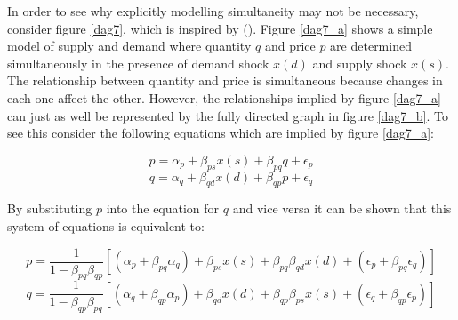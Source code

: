 \documentclass{article}
\begin{document}
In order to see why explicitly modelling simultaneity may not be necessary, consider figure \ref{dag7}, which is inspired by \citeauthor{imbens2019potential} (\citeyear{imbens2019potential}). Figure \ref{dag7_a} shows a simple model of supply and demand where quantity $q$ and price $p$ are determined simultaneously in the presence of demand shock $x(d)$ and supply shock $x(s)$. The relationship between quantity and price is simultaneous because changes in each one affect the other. However, the relationships implied by figure \ref{dag7_a} can just as well be represented by the fully directed graph in figure \ref{dag7_b}. To see this consider the following equations which are implied by figure \ref{dag7_a}:

\begin{equation}
  p = \alpha_p + \beta_{ps} x(s) + \beta_{pq} q + \epsilon_{p}
\end{equation}
\begin{equation}
  q = \alpha_q + \beta_{qd} x(d) + \beta_{qp} p + \epsilon_{q}
\end{equation}

By substituting $p$ into the equation for $q$ and vice versa it can be shown that this system of equations is equivalent to:

\begin{equation}
  \label{price_eq}
  p = \frac{1}{1-\beta_{pq}\beta_{qp}}[(\alpha_p + \beta_{pq} \alpha_q) + \beta_{ps} x(s) + \beta_{pq} \beta_{qd} x(d) + (\epsilon_p + \beta_{pq} \epsilon_q)]
\end{equation}
\begin{equation}
  \label{quantity_eq}
  q = \frac{1}{1-\beta_{qp}\beta_{pq}}[(\alpha_q + \beta_{qp} \alpha_p) + \beta_{qd} x(d) + \beta_{qp} \beta_{ps} x(s) + (\epsilon_q + \beta_{qp} \epsilon_p)]
\end{equation}
\end{document}
